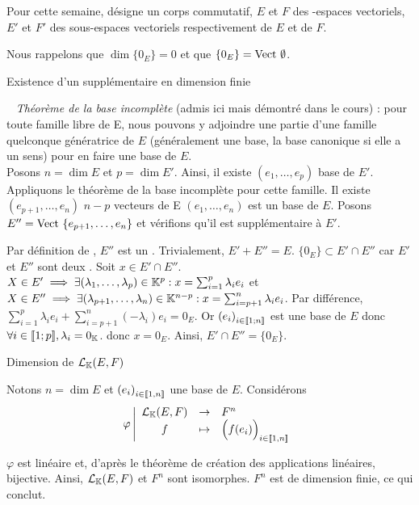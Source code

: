 \documentclass{article}
\renewenvironment{question_kholle}[2][ ]
{
	\subsection{\texorpdfstring{#2}{}}
	\notblank{#1}
	{
		\noindent #1
		\bigbreak
	}
	{}
	\begin{proof}
}
{
	\end{proof}
}
\begin{document}
Pour cette semaine, \K désigne un corps commutatif, $E$ et $F$ des \K\!\!-espaces vectoriels, $E'$ et $F'$ des sous-espaces vectoriels respectivement de $E$ et de $F$.

Nous rappelons que $\dim \{0_E\} = 0$ et que $\{0_E\} = \text{Vect } \emptyset$.

\begin{question_kholle}
	{Existence d'un supplémentaire en dimension finie}

	~\newline
	\textit{Théorème de la base incomplète} (admis ici mais démontré dans le cours) : pour toute famille libre de E, nous pouvons y adjoindre une partie d'une famille quelconque génératrice de $E$ (généralement une base, la base canonique si elle a un sens) pour en faire une base de $E$. \\

	Posons $n = \dim E$ et $p = \dim E'$. Ainsi, il existe $(e_1, \ldots, e_p)$ base de $E'$.
	Appliquons le théorème de la base incomplète pour cette famille.
	Il existe $(e_{p+1}, \ldots, e_n)$ $n-p$ vecteurs de E \tq $(e_1, \ldots, e_n)$ est un base de $E$.
	Posons $E'' = \text{Vect } \{ e_{p+1}, \ldots, e_n \}$ et vérifions qu'il est supplémentaire à $E'$.

	Par définition de \Vect\!\!, $E''$ est un \sev.
	Trivialement, $E' + E'' = E$.
	$\{0_E\} \subset E' \cap E''$ car $E'$ et $E''$ sont deux \sevs.
	Soit $x \in E' \cap E''$.
	$X \in E' \implies \exists (\lambda_1, \ldots, \lambda_p) \in \mathbb K^p : x = \sum_{i=1}^{p} \lambda_i e_i$ et
	$X \in E'' \implies \exists (\lambda_{p+1}, \ldots, \lambda_n) \in \mathbb K^{n-p} : x = \sum_{i=p+1}^{n} \lambda_i e_i$.
	Par différence, $\sum_{i=1}^{p} \lambda_i e_i + \sum_{i=p+1}^{n} \left(-\lambda_i\right) e_i = 0_E$.
	Or $\left(e_i\right)_{i \in [\![ 1 ; n ]\!]}$ est une base de $E$ donc $\forall i \in [\![ 1 ; p ]\!], \lambda_i = 0_{\mathbb K}$.
	donc $x = 0_E$.
	Ainsi, $E' \cap E'' = \{0_E\}$.
\end{question_kholle}

\begin{question_kholle}
	[$\mathcal{L}_\K(E,F)$ est dimension finie et
		\begin{equation}
			\dim \mathcal{L}_\K(E,F) = \dim E \times \dim F
		\end{equation}]
	{Dimension de $\mathcal{L}_\K(E,F)$}

	Notons $n = \dim E$ et $\left(e_i\right)_{i \in [\![ 1 , n ]\!]}$ une base de $E$. Considérons
	\begin{equation*}
		\varphi
		\left| \begin{array}{ccl}
			\mathcal{L}_{\mathbb K}(E,F) & \to     & F^n                                            \\
			f                   & \mapsto & \Big( f(e_i) \Big)_{i \in [\![ 1 , n ]\!]}
		\end{array} \right.
	\end{equation*}

	$\varphi$ est linéaire et, d'après le théorème de création des applications linéaires, bijective.
	Ainsi, $\mathcal{L}_\K(E,F)$ et $F^n$ sont isomorphes. $F^n$ est de dimension finie, ce qui conclut.
\end{question_kholle}
\end{document}

